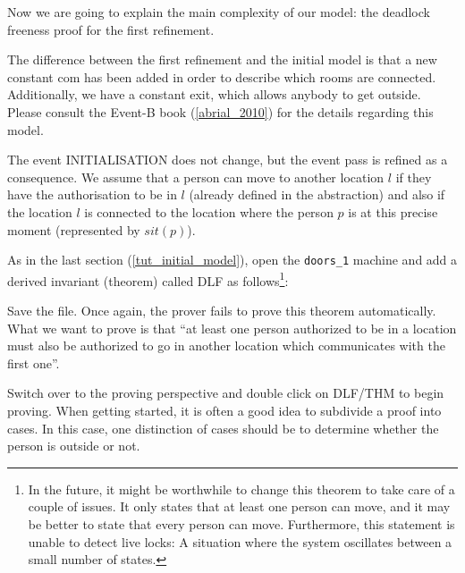 Now we are going to explain the main complexity of our model: the deadlock freeness proof for the first refinement.


The difference between the first refinement and the initial model is that a new constant \textsf{com} has been added in order to describe which rooms are connected. Additionally, we have a constant \textsf{exit}, which allows anybody to get outside.  Please consult the Event-B book (\ref{abrial_2010}) for the details regarding this model.

The event \textsf{INITIALISATION} does not change, but the event \textsf{pass} is refined as a consequence. We assume that a person can move to another location $l$ if they have the authorisation to be in $l$ (already defined in the abstraction) and also if the location $l$ is connected to the location where the person $p$ is at this precise moment (represented by $sit(p)$).


As in the last section (\ref{tut_initial_model}), open the \texttt{doors\_1} machine and add a derived invariant (theorem) called \textsf{DLF} as follows\footnote{In the future, it might be worthwhile to change this theorem to take care of a couple of issues. It only states that at least one person can move, and it may be better to state that every person can move.  Furthermore, this statement is unable to detect live locks: A situation where the system oscillates between a small number of states.}:


Save the file. Once again, the prover fails to prove this theorem automatically. What we want to prove is that ``at least one person authorized to be in a location must also be authorized to go in another location which communicates with the first one''.

Switch over to the proving perspective and double click on \textsf{DLF/THM} to begin proving. When getting started, it is often a good idea to subdivide a proof into cases.  In this case, one distinction of cases should be to determine whether the person is outside or not.

